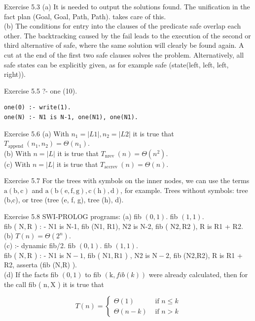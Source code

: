 \documentclass[10pt]{book}
\begin{document}
Exercise 5.3
(a) It is needed to output the solutions found. The unification in the fact plan (Goal, Goal, Path, Path). takes care of this.\\

(b) The conditions for entry into the clauses of the predicate safe overlap each other. The backtracking caused by the fail leads to the execution of the second or third alternative of safe, where the same solution will clearly be found again. A cut at the end of the first two safe clauses solves the problem. Alternatively, all safe states can be explicitly given, as for example safe (state(left, left, left, right)).

Exercise 5.5 ?- one (10).
\begin{verbatim}
one(0) :- write(1).
one(N) :- N1 is N-1, one(N1), one(N1).
\end{verbatim}

Exercise 5.6
(a) With $n_{1}=|L 1|, n_{2}=|L 2|$ it is true that $T_{\text {append }}\left(n_{1}, n_{2}\right)=\Theta\left(n_{1}\right)$.\\
(b) With $n=|L|$ it is true that $T_{\text {nrev }}(n)=\Theta\left(n^{2}\right)$.\\
(c) With $n=|L|$ it is true that $T_{\text {accrev }}(n)=\Theta(n)$.

Exercise 5.7 For the trees with symbols on the inner nodes, we can use the terms $\mathrm{a}(\mathrm{b}, \mathrm{c})$ and $\mathrm{a}(\mathrm{b}(\mathrm{e}, \mathrm{f}, \mathrm{g}), \mathrm{c}(\mathrm{h}), \mathrm{d})$, for example. Trees without symbols: tree (b,c), or tree (tree (e, f, g), tree (h), d).

Exercise 5.8 SWI-PROLOG programs:
(a) fib $(0,1)$. fib $(1,1)$.\\
fib ( $\mathrm{N}, \mathrm{R}$ ) : - N1 is N-1, fib (N1, R1), N2 is N-2, fib ( $\mathrm{N} 2, \mathrm{R} 2$ ), R is R1 + R2.\\
(b) $T(n)=\Theta\left(2^{n}\right)$.\\
(c) :- dynamic fib/2. fib $(0,1)$. fib $(1,1)$.\\
fib ( $\mathrm{N}, \mathrm{R}$ ) : - N1 is $\mathrm{N}-1$, fib ( $\mathrm{N} 1, \mathrm{R} 1$ ) , N2 is $\mathrm{N}-2$, fib (N2,R2), R is R1 + R2, asserta (fib (N,R) ).\\
(d) If the facts fib $(0,1)$ to fib $(\mathrm{k}, f i b(k))$ were already calculated, then for the call fib ( $\mathrm{n}, \mathrm{X}$ ) it is true that

$$
T(n)= \begin{cases}\Theta(1) & \text { if } n \leq k \\ \Theta(n-k) & \text { if } n>k\end{cases}
$$
\end{document}
